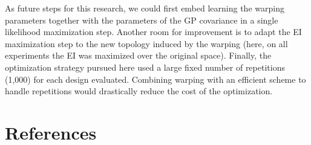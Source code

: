 As future steps for this research, we could first embed learning the warping parameters together with the parameters of the GP covariance 
in a single likelihood maximization step. Another room for improvement is to adapt the EI maximization step to the new topology induced by the warping
(here, on all experiments the EI was maximized over the original space). Finally, the optimization strategy pursued here used a large fixed number of 
repetitions (1,000) for each design evaluated. Combining warping with an efficient scheme to handle repetitions \cite{jalali2017comparison} would drastically reduce the cost 
of the optimization.



% 

\section*{References}


